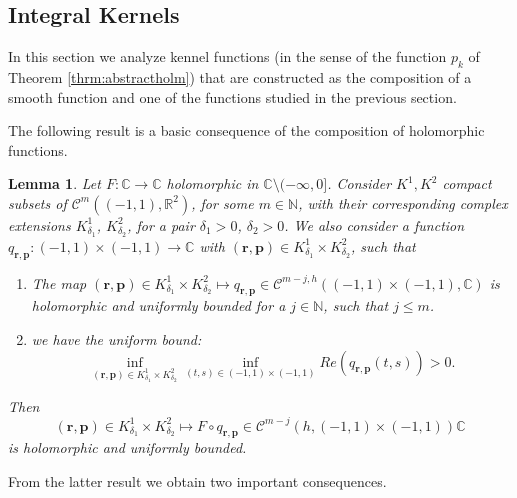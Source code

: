 \documentclass{article}
\newtheorem{lemma}[theorem]{Lemma}
\newcommand{\IC}{{\mathbb C}}
\newcommand{\IN}{{\mathbb N}}
\newcommand{\IR}{{\mathbb R}}
\newcommand{\bp}{{\bm p}}
\newcommand{\cmspace}[3]{\mathcal{C}^{#1} \left( #2, #3 \right)}
\newcommand{\cmspaceh}[4]{\mathcal{C}^{#1,#2} \left( #3, #4 \right)}
\newcommand{\br}{\bm{r}}
\begin{document}
\subsection{Integral Kernels}
In this section we analyze kennel functions (in the sense of the function $p_k$ of Theorem \ref{thrm:abstractholm}) that are constructed as the composition of a smooth function and one of the functions studied in the previous section. 

The following result is a basic consequence of the composition of holomorphic functions. 

\begin{lemma}
\label{lemma:Fcircq}
Let $F :\IC \rightarrow \IC$ holomorphic in $\IC \setminus (-\infty,0]$. Consider $K^1, K^2$ compact subsets of $\cmspace{m}{(-1,1)}{\IR^2}$, for some $m \in \IN$, with their corresponding complex extensions $K^1_{\delta_1}$, $K^2_{\delta_2}$, for a pair $\delta_1 >0$, $\delta_2>0$. We also consider a function $q_{\br,\bp} :(-1,1)\times (-1,1) \rightarrow \IC$ with $(\br,\bp) \in K^1_{\delta_1} \times K^2_{\delta_2}$, such that  
\begin{enumerate}
\item 
The map $(\br,\bp)  \in K^1_{\delta_1} \times K^2_{\delta_2} \mapsto q_{\br,\bp} \in \cmspaceh{m-j}{h}{(-1,1)\times(-1,1)}{\IC}$ is holomorphic and uniformly bounded for a $j\in \IN$, such that $j\leq m$. 
\item we have the uniform bound: 
$$
\inf_{(\br,\bp) \in K_{\delta_1}^1 \times K_{\delta_2}^2} \inf_{(t,s) \in (-1,1)\times(-1,1)} Re( q_{\br,\bp}(t,s))>0.
$$
\end{enumerate}
Then 
$$(\br,\bp)  \in K^1_{\delta_1} \times K^2_{\delta_2} \mapsto  F \circ q_{\br,\bp} \in \cmspace{m-j}{h}{(-1,1)\times(-1,1)}{\IC}$$
is holomorphic and uniformly bounded.
\end{lemma} 
From the latter result we obtain two important consequences. 
\end{document}
